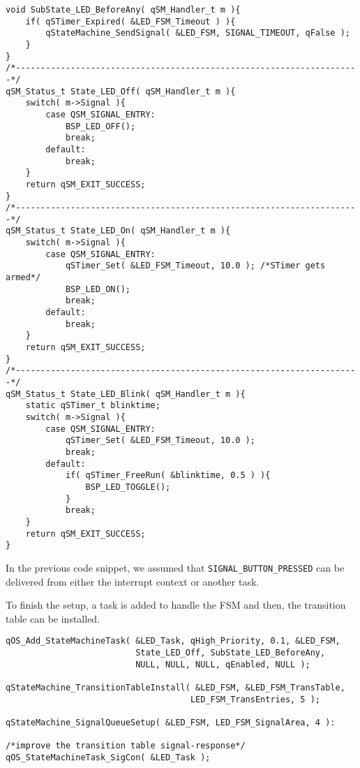 \begin{lstlisting}[style=CStyle]
void SubState_LED_BeforeAny( qSM_Handler_t m ){
    if( qSTimer_Expired( &LED_FSM_Timeout ) ){
        qStateMachine_SendSignal( &LED_FSM, SIGNAL_TIMEOUT, qFalse );
    }
}
/*---------------------------------------------------------------------*/
qSM_Status_t State_LED_Off( qSM_Handler_t m ){
    switch( m->Signal ){
        case QSM_SIGNAL_ENTRY:
            BSP_LED_OFF();
            break;
        default:
            break;
    }
    return qSM_EXIT_SUCCESS;
}
/*---------------------------------------------------------------------*/
qSM_Status_t State_LED_On( qSM_Handler_t m ){
    switch( m->Signal ){
        case QSM_SIGNAL_ENTRY:
            qSTimer_Set( &LED_FSM_Timeout, 10.0 ); /*STimer gets armed*/
            BSP_LED_ON();
            break;
        default:
            break;    
    }
    return qSM_EXIT_SUCCESS;
}
/*---------------------------------------------------------------------*/
qSM_Status_t State_LED_Blink( qSM_Handler_t m ){
    static qSTimer_t blinktime;
    switch( m->Signal ){
        case QSM_SIGNAL_ENTRY:
            qSTimer_Set( &LED_FSM_Timeout, 10.0 );
            break;
        default:
            if( qSTimer_FreeRun( &blinktime, 0.5 ) ){
                BSP_LED_TOGGLE();
            }        
            break;        
    }
    return qSM_EXIT_SUCCESS;
}
\end{lstlisting}

In the previous code snippet, we assumed that \lstinline{SIGNAL_BUTTON_PRESSED} can be delivered from either the interrupt context or another task.

To finish the setup, a task is added to handle the FSM and then, the transition table can be installed. \\

\begin{lstlisting}[style=CStyle]
qOS_Add_StateMachineTask( &LED_Task, qHigh_Priority, 0.1, &LED_FSM, 
                          State_LED_Off, SubState_LED_BeforeAny, 
                          NULL, NULL, NULL, qEnabled, NULL );
                          
qStateMachine_TransitionTableInstall( &LED_FSM, &LED_FSM_TransTable,   
                                     LED_FSM_TransEntries, 5 );
                                     
qStateMachine_SignalQueueSetup( &LED_FSM, LED_FSM_SignalArea, 4 ):

/*improve the transition table signal-response*/                                    
qOS_StateMachineTask_SigCon( &LED_Task );  
\end{lstlisting}

